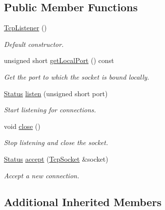 \subsection*{Public Member Functions}
\begin{DoxyCompactItemize}
\item 
\hypertarget{classsf_1_1TcpListener_a59a1db5b6f4711a3e57390da2f8d9630}{\hyperlink{classsf_1_1TcpListener_a59a1db5b6f4711a3e57390da2f8d9630}{Tcp\-Listener} ()}\label{classsf_1_1TcpListener_a59a1db5b6f4711a3e57390da2f8d9630}

\begin{DoxyCompactList}\small\item\em Default constructor. \end{DoxyCompactList}\item 
unsigned short \hyperlink{classsf_1_1TcpListener_a3bb62b92684cd1a14b14efdaf0471440}{get\-Local\-Port} () const 
\begin{DoxyCompactList}\small\item\em Get the port to which the socket is bound locally. \end{DoxyCompactList}\item 
\hyperlink{classsf_1_1Socket_a51bf0fd51057b98a10fbb866246176dc}{Status} \hyperlink{classsf_1_1TcpListener_a409d9350d3abfea9636df8cf4a61004e}{listen} (unsigned short port)
\begin{DoxyCompactList}\small\item\em Start listening for connections. \end{DoxyCompactList}\item 
void \hyperlink{classsf_1_1TcpListener_a3a00a850506bd0f9f48867a0fe59556b}{close} ()
\begin{DoxyCompactList}\small\item\em Stop listening and close the socket. \end{DoxyCompactList}\item 
\hyperlink{classsf_1_1Socket_a51bf0fd51057b98a10fbb866246176dc}{Status} \hyperlink{classsf_1_1TcpListener_ae2c83ce5a64d50b68180c46bef0a7346}{accept} (\hyperlink{classsf_1_1TcpSocket}{Tcp\-Socket} \&socket)
\begin{DoxyCompactList}\small\item\em Accept a new connection. \end{DoxyCompactList}\end{DoxyCompactItemize}
\subsection*{Additional Inherited Members}


